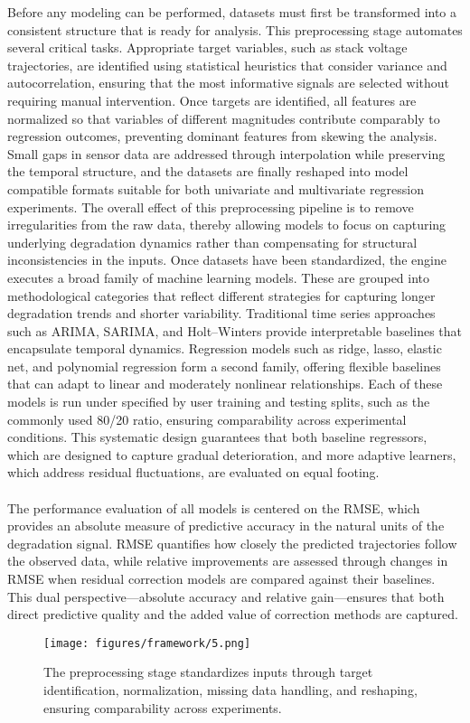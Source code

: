 Before any modeling can be performed, datasets must first be transformed into a consistent structure that is ready for analysis. This preprocessing stage automates several critical tasks. Appropriate target variables, such as stack voltage trajectories, are identified using statistical heuristics that consider variance and autocorrelation, ensuring that the most informative signals are selected without requiring manual intervention. Once targets are identified, all features are normalized so that variables of different magnitudes contribute comparably to regression outcomes, preventing dominant features from skewing the analysis. Small gaps in sensor data are addressed through interpolation while preserving the temporal structure, and the datasets are finally reshaped into model compatible formats suitable for both univariate and multivariate regression experiments. The overall effect of this preprocessing pipeline is to remove irregularities from the raw data, thereby allowing models to focus on capturing underlying degradation dynamics rather than compensating for structural inconsistencies in the inputs.
Once datasets have been standardized, the engine executes a broad family of machine learning models. These are grouped into methodological categories that reflect different strategies for capturing longer degradation trends and shorter variability. Traditional time series approaches such as ARIMA, SARIMA, and Holt–Winters provide interpretable baselines that encapsulate temporal dynamics. Regression models such as ridge, lasso, elastic net, and polynomial regression form a second family, offering flexible baselines that can adapt to linear and moderately nonlinear relationships. Each of these models is run under specified by user training and testing splits, such as the commonly used 80/20 ratio, ensuring comparability across experimental conditions. This systematic design guarantees that both baseline regressors, which are designed to capture gradual deterioration, and more adaptive learners, which address residual fluctuations, are evaluated on equal footing.
\\\\The performance evaluation of all models is centered on the RMSE, which provides an absolute measure of predictive accuracy in the natural units of the degradation signal. RMSE quantifies how closely the predicted trajectories follow the observed data, while relative improvements are assessed through changes in RMSE when residual correction models are compared against their baselines. This dual perspective—absolute accuracy and relative gain—ensures that both direct predictive quality and the added value of correction methods are captured. 
\begin{figure}[htbp] %
  \centering
  \texttt{[image: figures/framework/5.png]}
  \caption[Automated preprocessing pipeline ensuring analysis-ready datasets.]%
  {The preprocessing stage standardizes inputs through target identification,
  normalization, missing data handling, and reshaping, ensuring comparability
  across experiments.}
  \label{fig:automated_preprocessing}
\end{figure}

